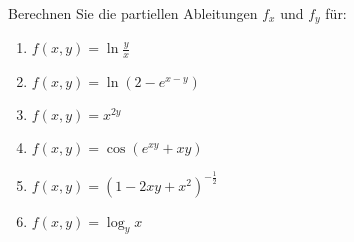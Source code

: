 \item Berechnen Sie die partiellen Ableitungen $f_x$ und $f_y$ für:

\begin{multicols}{2}
\begin{enumerate}
\item $f(x,y) = \ln\frac{y}{x}$
\item $f(x,y) = \ln(2-e^{x-y})$
\item $f(x,y) = x^{2y}$
\item $f(x,y) = \cos(e^{xy} + xy)$
\item $f(x,y) = (1-2xy+x^2)^{-\frac{1}{2}}$
\item $f(x,y) = \log_y{x}$
\end{enumerate}
\end{multicols}

